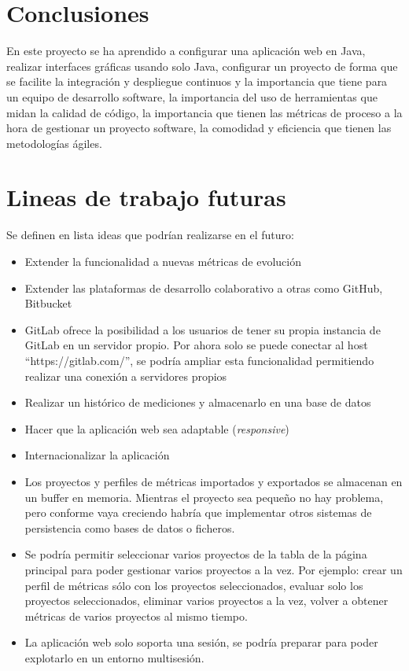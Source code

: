 
\section{Conclusiones}
En este proyecto se ha aprendido a configurar una aplicación web en Java, realizar interfaces gráficas usando solo Java, configurar un proyecto de forma que se facilite la integración y despliegue continuos y la importancia que tiene para un equipo de desarrollo software, la importancia del uso de herramientas que midan la calidad de código, la importancia que tienen las métricas de proceso a la hora de gestionar un proyecto software, la comodidad y eficiencia que tienen las metodologías ágiles.
\section{Lineas de trabajo futuras}
Se definen en lista ideas que podrían realizarse en el futuro:
\begin{itemize}
	\item Extender la funcionalidad a nuevas métricas de evolución
	\item Extender las plataformas de desarrollo colaborativo a otras como GitHub, Bitbucket
	\item GitLab ofrece la posibilidad a los usuarios de tener su propia instancia de GitLab en un servidor propio. Por ahora solo se puede conectar al host ``https://gitlab.com/'', se podría ampliar esta funcionalidad permitiendo realizar una conexión a servidores propios
	\item Realizar un histórico de mediciones y almacenarlo en una base de datos
	\item Hacer que la aplicación web sea adaptable (\textit{responsive})
	\item Internacionalizar la aplicación
	\item Los proyectos y perfiles de métricas importados y exportados se almacenan en un buffer en memoria. Mientras el proyecto sea pequeño no hay problema, pero conforme vaya creciendo habría que implementar otros sistemas de persistencia como bases de datos o ficheros.
	\item Se podría permitir seleccionar varios proyectos de la tabla de la página principal para poder gestionar varios proyectos a la vez. Por ejemplo: crear un perfil de métricas sólo con los proyectos seleccionados, evaluar solo los proyectos seleccionados, eliminar varios proyectos a la vez, volver a obtener métricas de varios proyectos al mismo tiempo.
	\item La aplicación web solo soporta una sesión, se podría preparar para poder explotarlo en un entorno multisesión.
\end{itemize}